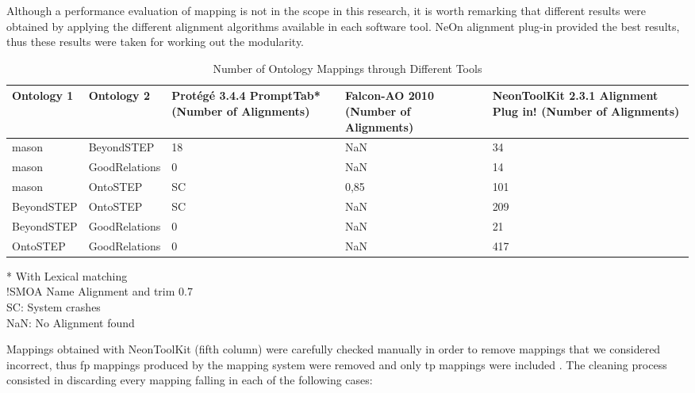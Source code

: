 Although a performance evaluation of mapping is not in the scope in this research, it is worth remarking that different results were obtained by applying the different alignment algorithms available in each software tool. NeOn alignment plug-in provided the best results, thus these results were taken for working out the modularity.



\begin{table}[tp]%
	
	\caption{Number of Ontology Mappings through Different Tools}
	\label{table4.3}\centering
	\begin{tabular}{p{2.5cm} p{2.5cm} p{2.5cm} p{2.5cm} p{2.5cm} }\toprule
		
		Ontology 1 &	Ontology 2	& Protégé 3.4.4 PromptTab*
		(Number of Alignments)	&Falcon-AO
		2010
		(Number of Alignments)	&NeonToolKit 2.3.1
		Alignment Plug in!
		(Number of Alignments) \\\toprule
		
		\gls{mason} &	BeyondSTEP&	18&	NaN	&34  \\\toprule
		\gls{mason} &	GoodRelations&	0&	NaN&	14 \\\toprule
		\gls{mason}	&OntoSTEP&	SC&	0,85&	101 \\\toprule
		BeyondSTEP&	OntoSTEP&	SC&	NaN&	209 \\\toprule
		BeyondSTEP&	GoodRelations&	0&	NaN	&21 \\\toprule
		OntoSTEP&	GoodRelations&	0&	NaN&	417 \\\toprule
		
	\end{tabular}
	\begin{flushleft}
		* With Lexical matching\\
		!SMOA Name Alignment and trim 0.7\\
		SC: System crashes \\
		NaN: No Alignment found\\
	\end{flushleft}
	
	
	
\end{table}

Mappings obtained with NeonToolKit (fifth column) were carefully checked manually in order to remove mappings that we considered incorrect, thus    \gls{fp} mappings produced by the mapping system were removed and only \gls{tp} mappings were included \cite{oliver_kutz_chinese_2010}. The cleaning process consisted in discarding every mapping falling in each of the following cases:

